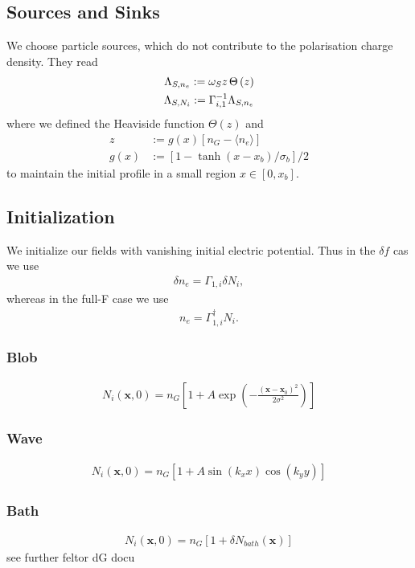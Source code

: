 \documentclass{hitec} %
\renewcommand{\vec}[1]{\boldsymbol{#1}}
\begin{document}
\subsection{Sources and Sinks}
We choose particle sources, which do not contribute to the polarisation charge density. They read
\begin{align}
 \Lambda_{S,n_e} :=\omega_S z \hspace{0.5mm} \Theta \left(z\right)  \\
 \Lambda_{S,N_i} := \Gamma_{i,1}^{-1} \Lambda_{S,n_e}
\end{align}
where we defined the  Heaviside function \(\Theta(z)\) and  
 \begin{align}
  z&:=g(x) \left[n_G - \langle n_e \rangle\right] \\
  g(x) &:= \left[1-\tanh{(x-x_b)/\sigma_b}\right]/2 
 \end{align}
to maintain the initial profile in a small region \(x \in \left[0,x_b\right]\).
\subsection{Initialization}
We initialize our fields with vanishing initial electric potential. Thus in the \(\delta f\) cas we use
\begin{align}
  \delta n_e  =\Gamma_{1,i} \delta  N_i,
\end{align}
whereas in the full-F case we use
\begin{align}
  n_e  =\Gamma_{1,i}^\dagger N_i.
\end{align}
\subsubsection{Blob}
\begin{align}
N_{i}\left(\vec{x},0\right) =   n_G\left[1+A \exp{\left(-\frac{\left(\vec{x}-\vec{x}_0\right)^2}{2\sigma^2}\right)}\right]
\end{align}
\subsubsection{Wave}
\begin{align}
N_{i}\left(\vec{x},0\right) =   n_G\left[1+A \sin{(k_x x)} \cos{(k_y y)}\right]  
\end{align}
\subsubsection{Bath}
\begin{align}
N_{i}\left(\vec{x},0\right) =   n_G\left[1+\delta N_{bath}(\vec{x})\right]  
\end{align}
see further feltor dG docu
\end{document}
